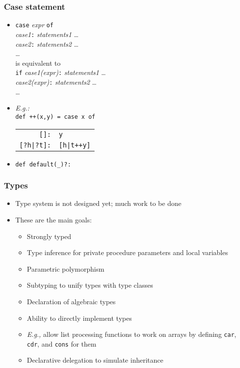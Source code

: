 \documentclass[12pt]{beamer}
\begin{document}
\begin{frame}
\frametitle{Case statement}
\begin{itemize}
\item \texttt{case} \emph{expr} \texttt{of} \\
\hspace*{1em} \emph{case1}\texttt{:} \emph{statements1} \ldots \\
\hspace*{1em} \emph{case2}\texttt{:} \emph{statements2} \ldots \\
\hspace*{1em} \ldots \\[2ex]
is equivalent to \\[2ex]
 \texttt{if} \emph{case1(expr)}\texttt{:} \emph{statements1} \ldots \\
\hspace*{1em} \emph{case2(expr)}\texttt{:} \emph{statements2} \ldots \\
\hspace*{1em} \ldots
\item \emph{E.g.:}\\
  \texttt{def ++(x,y) = case x of} \\
\hspace*{3em}
\begin{tabular}{rl}
\texttt{[]:} & \texttt{y}\\
\texttt{[?h|?t]:} & \texttt{[h|t++y]}\\
\end{tabular}
\item \texttt{def default(\_)?:}
\end{itemize}
\end{frame}


\begin{frame}
\frametitle{Types}
\begin{itemize}
\item Type system is not designed yet; much work to be done
\item These are the main goals:
  \begin{itemize}
  \item Strongly typed
  \item Type inference for private procedure parameters and local variables
  \item Parametric polymorphism
  \item Subtyping to unify types with type classes
  \item Declaration of algebraic types
  \item Ability to directly implement types
  \item \emph{E.g.,} allow list processing functions to work on arrays
    by defining \texttt{car}, \texttt{cdr}, and \texttt{cons} for them
  \item Declarative delegation to simulate inheritance
  \end{itemize}
\end{itemize}
\end{frame}
\end{document}
